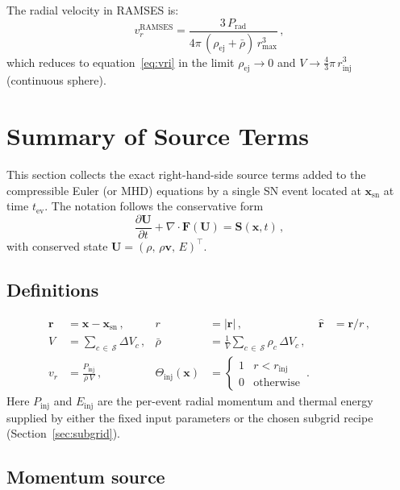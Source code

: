 \documentclass[11pt]{article}
\begin{document}
The radial velocity in RAMSES is:
\begin{equation}
  v_r^\mathrm{RAMSES} = \frac{3\,P_\mathrm{rad}}{4\pi\,(\rho_\mathrm{ej} + \bar{\rho})\,r_\mathrm{max}^3}\,,
\end{equation}
which reduces to equation~\eqref{eq:vri} in the limit $\rho_\mathrm{ej} \to 0$
and $V \to \frac{4}{3}\pi\,r_\mathrm{inj}^3$ (continuous sphere).

\section{Summary of Source Terms}
\label{sec:source_terms}

This section collects the exact right-hand-side source terms added to the
compressible Euler (or MHD) equations by a single SN event located at
$\mathbf{x}_\mathrm{sn}$ at time $t_\mathrm{ev}$.  The notation follows the
conservative form
\begin{equation}
  \frac{\partial \mathbf{U}}{\partial t} + \nabla\cdot\mathbf{F}(\mathbf{U})
  = \mathbf{S}(\mathbf{x},t)\,,
\end{equation}
with conserved state $\mathbf{U} = (\rho,\,\rho\mathbf{v},\,E)^\top$.

\subsection*{Definitions}

\begin{align}
  \mathbf{r} &= \mathbf{x} - \mathbf{x}_\mathrm{sn}\,, & r &= |\mathbf{r}|\,, &
  \hat{\mathbf{r}} &= \mathbf{r}/r\,, \\[4pt]
  V &= \sum_{c\,\in\,\mathcal{S}} \Delta V_c\,, &
  \bar{\rho} &= \frac{1}{V}\sum_{c\,\in\,\mathcal{S}} \rho_c\,\Delta V_c\,, \\[4pt]
  v_r &= \frac{P_\mathrm{inj}}{\bar{\rho}\,V}\,, &
  \Theta_\mathrm{inj}(\mathbf{x}) &=
    \begin{cases} 1 & r < r_\mathrm{inj} \\ 0 & \text{otherwise} \end{cases}\,.
\end{align}
Here $P_\mathrm{inj}$ and $E_\mathrm{inj}$ are the per-event radial momentum
and thermal energy supplied by either the fixed input parameters or the chosen
subgrid recipe (Section~\ref{sec:subgrid}).

\subsection*{Momentum source}
\end{document}
